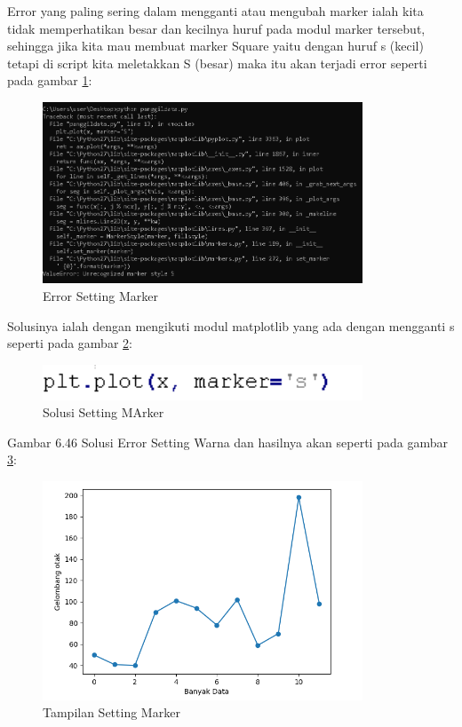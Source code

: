 Error yang paling sering dalam mengganti atau mengubah marker ialah kita tidak memperhatikan besar dan kecilnya huruf pada modul marker tersebut, sehingga jika kita mau membuat marker Square yaitu dengan huruf s (kecil) tetapi di script kita meletakkan S (besar) maka itu akan terjadi error seperti pada gambar \ref{fig:errsw}:
\begin{figure}[!htbp]
	\centerline{\includegraphics[width=0.85\textwidth]{figures/6/errsw.PNG}}
	\caption{Error Setting Marker}
	\label{fig:errsw}
\end{figure}   

Solusinya ialah dengan mengikuti modul matplotlib yang ada dengan mengganti s seperti pada gambar \ref{fig:solsw}:
\begin{figure}[!htbp]
	\centerline{\includegraphics[width=0.85\textwidth]{figures/6/solsw.PNG}}
	\caption{Solusi Setting MArker}
	\label{fig:solsw}
\end{figure}   


             Gambar 6.46 Solusi Error Setting Warna
dan hasilnya akan seperti pada gambar \ref{fig:showsw}:
\begin{figure}[!htbp]
	\centerline{\includegraphics[width=0.85\textwidth]{figures/6/showsw.PNG}}
	\caption{Tampilan Setting Marker}
	\label{fig:showsw}
\end{figure}